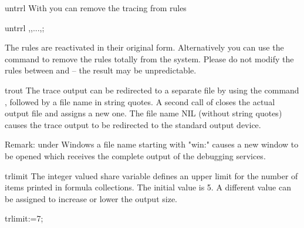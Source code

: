 \begin{Operator}{untrrl}
With  you can remove the tracing from rules
\begin{Syntax}
   untrrl ,,...,;
\end{Syntax}
The rules are reactivated in their original form. Alternatively
you can use the command  to remove the
rules totally from the system. Please do not modify the
rules between  and  -- the result
may be unpredictable. 
\end{Operator}  


\begin{Operator}{trout}
The trace output can be redirected to a separate file
by using the command , followed
by a file name in string quotes. A second call of 
closes the actual output file and assigns a new one. 
The file name NIL (without string quotes) causes the trace output 
to be redirected to the standard output device.

Remark: under Windows a file name starting with "win:" causes
a new window to be opened which receives the complete 
output of the debugging services.
\end{Operator}


\begin{Variable}{trlimit}
The integer valued share variable  defines
an upper limit for the number of items printed in formula
collections. The
initial value is 5. A different value can be assigned to
increase or lower the output size.
\begin{Examples}
   trlimit:=7;\\
\end{Examples}
\end{Variable}



